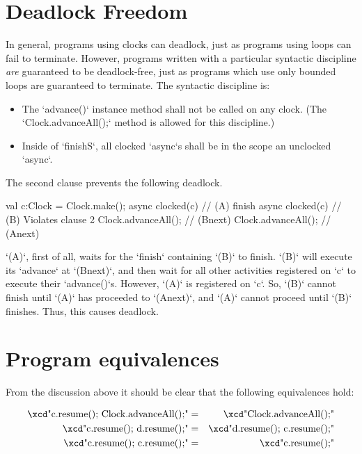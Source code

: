 \section{Deadlock Freedom}

In general, programs using clocks can deadlock, just as programs using loops
can fail to terminate.  However, programs written with a particular syntactic
discipline {\em are} guaranteed to be deadlock-free, just as programs which
use only bounded loops are guaranteed to terminate.  The syntactic discipline
is: 
\begin{itemize}
\item The \xcd`advance()` {instance method} shall not be called on any clock.
      (The 
      \xcd`Clock.advanceAll();` method is allowed for this discipline.)
\item Inside of \xcd`finish{S}`, all clocked \xcd`async`s shall be in the scope
      an unclocked \xcd`async`.  
\end{itemize}


The second clause prevents the following deadlock.  
\begin{xten}
val c:Clock = Clock.make();
async clocked(c) {                // (A) 
      finish async clocked(c) {   // (B) Violates clause 2
            Clock.advanceAll();                 // (Bnext)
      }
      Clock.advanceAll();                       // (Anext)
}
\end{xten}
\xcd`(A)`, first of all, waits for the \xcd`finish` containing \xcd`(B)` to
finish.  
\xcd`(B)` will execute its \xcd`advance` at \xcd`(Bnext)`, and then wait for all
other activities registered on \xcd`c` to execute their \xcd`advance()`s.
However, \xcd`(A)` is registered on \xcd`c`.  So, \xcd`(B)` cannot finish
until \xcd`(A)` has proceeded to \xcd`(Anext)`, and \xcd`(A)` cannot proceed
until \xcd`(B)` finishes. Thus, this causes deadlock.


\section{Program equivalences}
From the discussion above it should be clear that the following
equivalences hold:

\begin{eqnarray}
 \mbox{\xcd"c.resume(); Clock.advanceAll();"}       &=& \mbox{\xcd"Clock.advanceAll();"}\\
 \mbox{\xcd"c.resume(); d.resume();"} &=& \mbox{\xcd"d.resume(); c.resume();"}\\
 \mbox{\xcd"c.resume(); c.resume();"} &=& \mbox{\xcd"c.resume();"}
\end{eqnarray}

